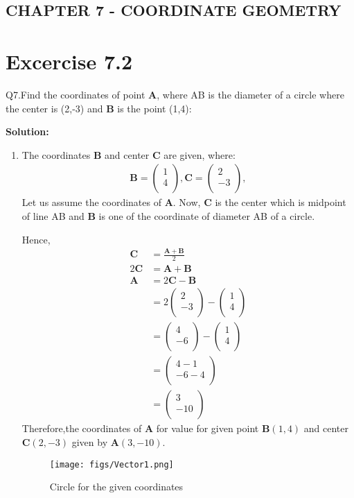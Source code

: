\documentclass[12pt]{article}
\newcommand{\solution}{\noindent \textbf{Solution: }}
\newcommand{\myvec}[1]{\ensuremath{\begin{pmatrix}#1\end{pmatrix}}}
\let\vec\mathbf
\begin{document}
\begin{center}
\section*{CHAPTER 7 - COORDINATE GEOMETRY}

\end{center}
\section*{Excercise 7.2}

Q7.Find the coordinates of point $\vec{A}$, where AB is the diameter of a circle where the center is (2,-3) and $\vec{B}$ is the point (1,4):

\solution
\begin{enumerate}
\item The coordinates $\vec{B}$ and center $\vec{C}$ are given, where:
	\begin{align}
	\vec{B} = \myvec{
		1\\
	    4\\
		},
	\vec{C} = \myvec{
	    2\\
	   -3\\
		},
	\end{align}
Let us assume the coordinates of $\vec{A}$. Now, $\vec{C}$ is the center which is midpoint of line AB and $\vec{B}$ is one of the coordinate of diameter AB of a circle.
		
Hence,	
	\begin{align}
	\vec{C} &= \frac{\vec{A+B}}{2} \\
	2\vec{C} &= \vec{A}+\vec{B} \\
	\vec{A} &= 2\vec{C}-\vec{B} \\
	 &= 2\myvec{2\\-3\\}-\myvec{1\\4\\} \\
	 &= \myvec{4\\-6\\}-\myvec{1\\4\\} \\
	 &= \myvec{4-1\\-6-4\\} \\	
	 &= \myvec{3\\-10\\}	
	\end{align}       
    Therefore,the coordinates of $\vec{A}$ for value for given point $\vec{B}(1,4)$ and center $\vec{C}(2,-3)$ given by $\vec{A}(3,-10)$.	
\hspace{5mm}
\begin{figure}[!h]
\begin{center}	
	\texttt{[image: figs/Vector1.png]}
\end{center}
\caption{Circle for the given coordinates}
\label{fig:Fig}
\end{figure}
\end{enumerate}
\end{document}
